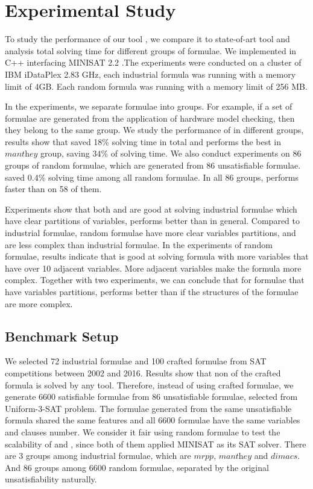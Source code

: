 \section{Experimental Study}\label{sec:expr}
To study the performance of our tool \tool, we compare it to state-of-art tool \minibones and analysis total solving time for different groups of formulae.
We implemented \tool in C++ interfacing MINISAT 2.2 \cite{MINISAT}.The experiments were conducted on a cluster of IBM iDataPlex 2.83 GHz, each industrial formula was running with a memory limit of 4GB. Each random formula was running with a memory limit of 256 MB.

In the experiments, we separate formulae into groups. For example, if a set of formulae are generated from the application of hardware model checking, then they belong to the same group. We study the performance of \tool in different groups, results show that \tool saved 18\% solving time in total and performs the best in $\textit{manthey}$ group, saving 34\% of solving time.
We also conduct experiments on 86 groups of random formulae, which are generated from 86 unsatisfiable formulae.
\tool saved 0.4\% solving time among all random formulae. In all 86 groups, \tool performs faster than \minibones on 58 of them.

Experiments show that both \tool and \minibones are good at solving industrial formulae which have clear partitions of variables, \tool performs better than \minibones in general. Compared to industrial formulae, random formulae have more clear variables partitions, and are less complex than industrial formulae. In the experiments of random formulae, results indicate that \tool is good at solving formula with more variables that have over 10 adjacent variables. More adjacent variables make the formula more complex. Together with two experiments, we can conclude that for formulae that have variables partitions, \tool performs better than \minibones if the structures of the formulae are more complex.

\subsection{Benchmark Setup}

We selected 72 industrial formulae and 100 crafted formulae from SAT competitions between 2002 and 2016. Results show that non of the crafted formula is solved by any tool. Therefore, instead of using crafted formulae, we generate 6600 satisfiable formulae from 86 unsatisfiable formulae, selected from Uniform-3-SAT problem. The formulae generated from the same unsatisfiable formula shared the same features and all 6600 formulae have the same variables and clauses number. We consider it fair using random formulae to test the scalability of \tool and \minibones, since both of them applied MINISAT as its SAT solver.
There are 3 groups among industrial formulae, which are $\textit{mrpp}$, $\textit{manthey}$ and $\textit{dimacs}$. And 86 groups among 6600 random formulae, separated by the original unsatisfiability naturally.

